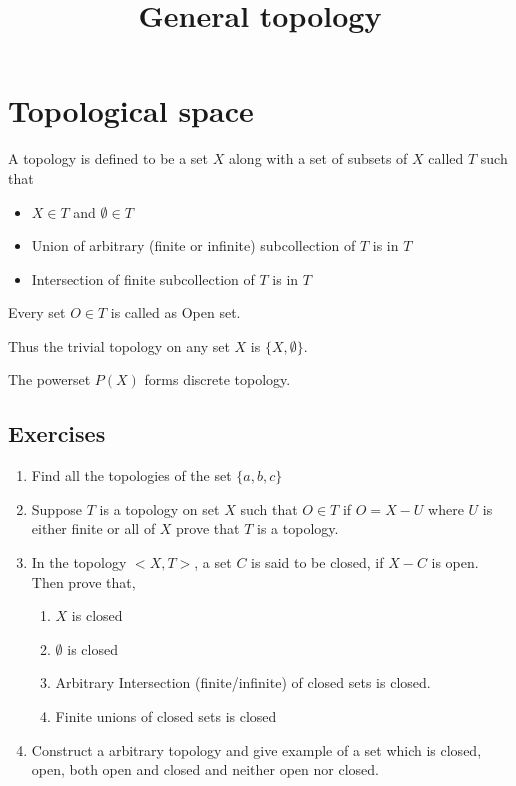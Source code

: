 \documentclass[twosides, openany]{tufte-book}
\title{General topology}
\begin{document}
\maketitle
\tableofcontents

\chapter{Topological space}
A topology is defined to be a set $X$ along with a set of subsets of $X$ called $T$ such that
\begin{itemize}
    \item $X \in T$ and $\emptyset \in T$
    \item Union of arbitrary (finite or infinite) subcollection of $T$ is in $T$
    \item Intersection of finite subcollection of $T$ is in $T$
\end{itemize}

Every set $O \in T$ is called as Open set.

Thus the trivial topology on any set $X$ is $\{X, \emptyset \}$.

The powerset $P(X)$ forms discrete topology.

\section{Exercises}
\begin{enumerate}
    \item Find all the topologies of the set $\{a, b, c\}$
    \item Suppose $T$ is a topology on set $X$ such that $O \in T$ if $O = X - U$ where $U$ is either finite or all of $X$ prove that $T$ is a topology.  
    \item In the topology $<X, T>$, a set $C$ is said to be closed, if $X -C$ is open. Then prove that, 
        \begin{enumerate}
            \item $X$ is closed
            \item $\emptyset$ is closed
            \item Arbitrary Intersection (finite/infinite) of closed sets is closed.
            \item Finite unions of closed sets is closed
        \end{enumerate}
    \item Construct a arbitrary topology and give example of a set which is closed, open, both open and closed and neither open nor closed.
\end{enumerate}
\end{document}
